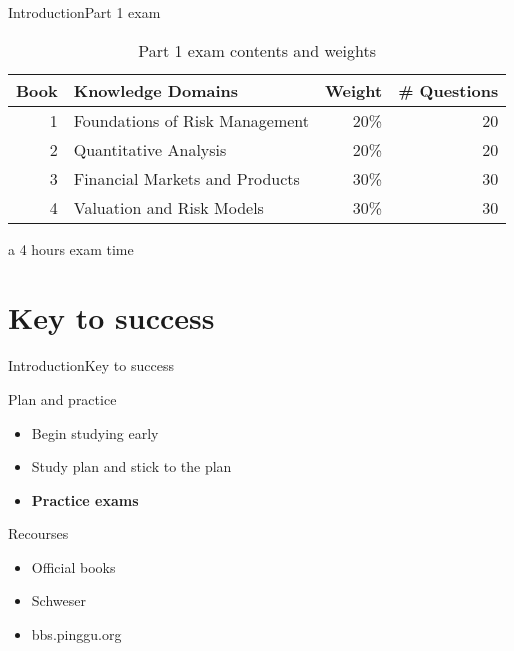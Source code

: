 \documentclass[10pt]{beamer}
\begin{document}
\begin{frame}{Introduction}{Part 1 exam}
\begin{table}
\centering
\caption{Part 1 exam contents and weights}
\begin{threeparttable}[htbp]
	\begin{tabular}{||r|l|r|r||}
		\hline
		\hline
		\multicolumn{1}{||l|}{Book} & Knowledge Domains & \multicolumn{1}{l|}{Weight} & \multicolumn{1}{l||}{\# Questions} \bigstrut\\
		\hline
		1     & Foundations of Risk Management & 20\%  & 20 \bigstrut\\
		\hline
		2     & Quantitative Analysis & 20\%  & 20 \bigstrut\\
		\hline
		3     & Financial Markets and Products & 30\%  & 30 \bigstrut\\
		\hline
		4     & Valuation and Risk Models & 30\%  & 30 \bigstrut\\
		\hline
		\hline
	\end{tabular}
	\begin{tablenotes}
		\item [a] 4 hours exam time 
	\end{tablenotes}
\end{threeparttable}
\label{tab:weights}
\end{table}
\end{frame}

\section{Key to success}
\begin{frame}{Introduction}{Key to success}
\begin{block}{Plan and practice}
	\begin{itemize}
		\item Begin studying early
		\item Study plan and stick to the plan
		\item \textbf{Practice exams}
	\end{itemize}
\end{block}

\begin{block}{Recourses}
	\begin{itemize}
		\item Official books
		\item Schweser 
		\item bbs.pinggu.org
	\end{itemize}
\end{block}
\end{frame}
\end{document}

